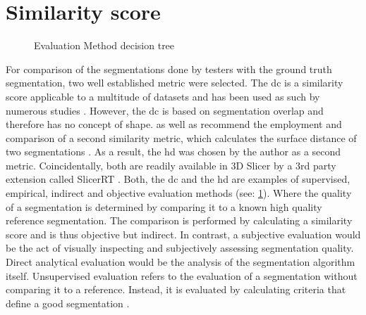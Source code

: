 \section{Similarity score}\label{s:similarity-score}
\begin{figure}[h!]
	
	\caption{Evaluation Method decision tree \cite{wangImageSegmentationEvaluation2020}}\label{fig:eval}
\end{figure}
\noindent
For comparison of the segmentations done by testers with the ground truth segmentation, two well established metric were selected.
The \acrfull{dc} is a similarity score applicable to a multitude of datasets and has been used as such by numerous studies \cite{setiawanImageSegmentationMetrics2020,atasPerformanceEvaluationJaccardDice2023}.
However, the \acrshort{dc} is based on segmentation overlap and therefore has no concept of shape.
 as well as
\citeauthor{wangImageSegmentationEvaluation2020} recommend the employment and comparison of a second similarity metric, which calculates the surface distance of two segmentations \cite{aspertMESHMeasuringErrors2002,simBrainVentricleDetection2016}.
As a result, the \acrfull{hd} was chosen by the author as a second metric.
Coincidentally, both are readily available in 3D Slicer by a 3rd party extension called SlicerRT \cite{pinterSlicerRTRadiationTherapy2012}.
Both, the \acrlong{dc} and the \acrlong{hd} are examples of supervised, empirical, indirect and objective evaluation methods (see: \cref{fig:eval}).
Where the quality of a segmentation is determined by comparing it to a known high quality reference segmentation.
The comparison is performed by calculating a similarity score and is thus objective but indirect.
In contrast, a subjective evaluation would be the act of visually inspecting and subjectively assessing segmentation quality.
Direct analytical evaluation would be the analysis of the segmentation algorithm itself.
Unsupervised evaluation refers to the evaluation of a segmentation without comparing it to a reference.
Instead, it is evaluated by calculating criteria that define a good segmentation \cite{wangImageSegmentationEvaluation2020}.


